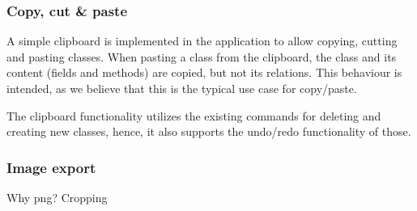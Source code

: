 \subsubsection{Copy, cut \& paste} 

A simple clipboard is implemented in the
application to allow copying, cutting and pasting classes. When pasting a class
from the clipboard, the class and its content (fields and methods) are copied,
but not its relations. This behaviour is intended, as we believe that this is
the typical use case for copy/paste.

The clipboard functionality utilizes the existing commands for deleting and
creating new classes, hence, it also supports the undo/redo functionality of
those.


\subsubsection{Image export} 

Why png? Cropping

